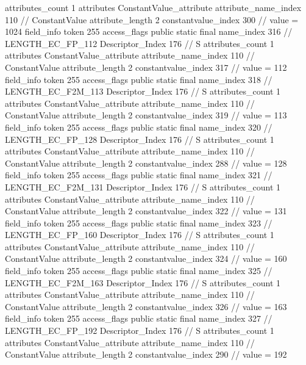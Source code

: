 {{{{{				attributes_count	1
				attributes {
				ConstantValue_attribute {
					attribute_name_index	110		// ConstantValue
					attribute_length	2
					constantvalue_index	300		// value = 1024
				}
				}
			}
			field_info {
				token	255
				access_flags	public static final
				name_index	316		// LENGTH_EC_FP_112
				Descriptor_Index	176		// S
				attributes_count	1
				attributes {
				ConstantValue_attribute {
					attribute_name_index	110		// ConstantValue
					attribute_length	2
					constantvalue_index	317		// value = 112
				}
				}
			}
			field_info {
				token	255
				access_flags	public static final
				name_index	318		// LENGTH_EC_F2M_113
				Descriptor_Index	176		// S
				attributes_count	1
				attributes {
				ConstantValue_attribute {
					attribute_name_index	110		// ConstantValue
					attribute_length	2
					constantvalue_index	319		// value = 113
				}
				}
			}
			field_info {
				token	255
				access_flags	public static final
				name_index	320		// LENGTH_EC_FP_128
				Descriptor_Index	176		// S
				attributes_count	1
				attributes {
				ConstantValue_attribute {
					attribute_name_index	110		// ConstantValue
					attribute_length	2
					constantvalue_index	288		// value = 128
				}
				}
			}
			field_info {
				token	255
				access_flags	public static final
				name_index	321		// LENGTH_EC_F2M_131
				Descriptor_Index	176		// S
				attributes_count	1
				attributes {
				ConstantValue_attribute {
					attribute_name_index	110		// ConstantValue
					attribute_length	2
					constantvalue_index	322		// value = 131
				}
				}
			}
			field_info {
				token	255
				access_flags	public static final
				name_index	323		// LENGTH_EC_FP_160
				Descriptor_Index	176		// S
				attributes_count	1
				attributes {
				ConstantValue_attribute {
					attribute_name_index	110		// ConstantValue
					attribute_length	2
					constantvalue_index	324		// value = 160
				}
				}
			}
			field_info {
				token	255
				access_flags	public static final
				name_index	325		// LENGTH_EC_F2M_163
				Descriptor_Index	176		// S
				attributes_count	1
				attributes {
				ConstantValue_attribute {
					attribute_name_index	110		// ConstantValue
					attribute_length	2
					constantvalue_index	326		// value = 163
				}
				}
			}
			field_info {
				token	255
				access_flags	public static final
				name_index	327		// LENGTH_EC_FP_192
				Descriptor_Index	176		// S
				attributes_count	1
				attributes {
				ConstantValue_attribute {
					attribute_name_index	110		// ConstantValue
					attribute_length	2
					constantvalue_index	290		// value = 192
				}
				}
			}
}}}}
